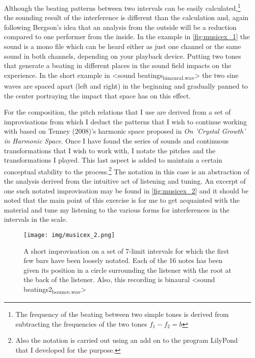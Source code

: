 \documentclass[11pt]{article}
\makeatletter
\newcommand{\cslcitation}[2]
 {\protect\hyper@linkstart{cite}{citeproc_bib_item_#1}#2\hyper@linkend}
\makeatother
\begin{document}
Although the beating patterns between two intervals can be easily calculated,\footnote{The frequency of the beating between two simple tones is derived from subtracting the frequencies of the two tones \(f_1-f_2 = b\)} the sounding result of the interference is different than the calculation and, again following Bergson's idea that an analysis from the outside will be a reduction compared to one performer from the inside.
In the example in \ref{fig:musicex_1} the sound is a mono file which can be heard either as just one channel or the same sound in both channels, depending on your playback device. Putting two tones that generate a beating in different places in the sound field impacts on the experience.
In the short example in <sound beatings\textsubscript{binaural.wav}> the two sine waves are spaced apart (left and right) in the beginning and gradually panned to the center portraying the impact that space has on this effect.

For the composition, the pitch relations that I use are derived from a set of improvisations from which I deduct the patterns that I wish to continue working with based on Tenney (\cslcitation{32}{2008})'s harmonic space proposed in \emph{On ’Crystal Growth’ in Harmonic Space}.
Once I have found the series of sounds and continuous transformations that I wish to work with, I notate the pitches and the transformations I played.
This last aspect is added to maintain a certain conceptual stability to the process.\footnote{Also the notation is carried out using an add on to the program LilyPond that I developed for the purpose.}
The notation in this case is an abstraction of the analysis derived from the intuitive act of listening and tuning.
An excerpt of one such notated improvisation may be found in \ref{fig:musicex_2} and it should be noted that the main point of this exercise is for me to get acquainted with the material and tune my listening to the various forms for interferences in the intervals in the scale.

\begin{figure}[htbp]
\centering
\texttt{[image: img/musicex\_2.png]}
\caption{\label{fig:orgd8da0b7}A short improvisation on a set of 7-limit intervals for which the first few bars have been loosely notated. Each of the 16 notes has been given its  position in a circle surrounding the listener with the root at the back of the listener. Also, this recording is binaural <sound beatings2\textsubscript{bounce.wav}>}
\end{figure}
\end{document}

